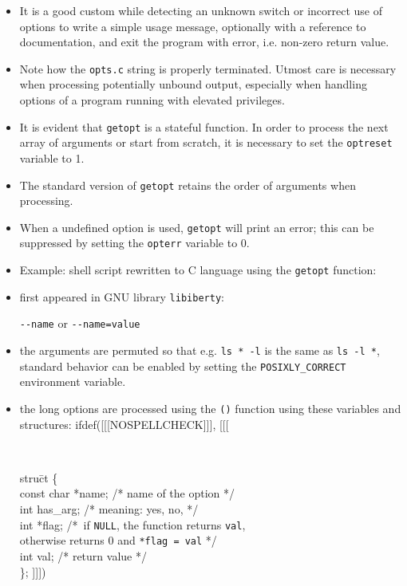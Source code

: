 \begin{itemize}
\item It is a good custom while detecting an unknown switch or incorrect use
of options to write a simple usage message, optionally with a reference to documentation,
and exit the program with error, i.e. non-zero return value.
\item Note how the \texttt{opts.c} string is properly terminated. Utmost care
is necessary when processing potentially unbound output, especially when
handling options of a program running with elevated privileges.
\item It is evident that \texttt{getopt} is a stateful function. In order to
process the next array of arguments or start from scratch, it is necessary to
set the \texttt{optreset} variable to 1.
\item The standard version of \texttt{getopt} retains the order of arguments when
processing.
\item When a undefined option is used, \texttt{getopt} will print an error;
this can be suppressed by setting the \texttt{opterr} variable to 0.
\item {} Example: shell script 
rewritten to C language using the \texttt{getopt} function:
\end{itemize}



\begin{slide}
\setlength{\baselineskip}{0.8\baselineskip}
\begin{itemize}
\item first appeared in GNU library \texttt{libiberty}:

\verb#--name# or \verb#--name=value#
\item the arguments are permuted so that e.g.
\verb#ls * -l# is the same as \verb#ls -l *#, standard behavior can be enabled
by setting the \verb#POSIXLY_CORRECT# environment variable.
\item the long options are processed using the \texttt{()}
function using these variables and structures:
ifdef([[[NOSPELLCHECK]]], [[[
{\tt
\begin{tabbing}
stru\=ct  \{\\
\>const char *name; \textrm{/* name of the option */} \\
\>int has\_arg; \textrm{/* meaning: yes, no,  */} \\
\>int *flag; \textrm{/*~}\=\textrm{if \texttt{NULL}, the function returns
\texttt{val}}, \\
\>\>\textrm{otherwise returns 0}
\textrm{and }\texttt{*flag = val}\textrm{ */} \\
\>int val; \textrm{/* return value */} \\
\};
]]])
\end{tabbing}}
\end{itemize}
\end{slide}

